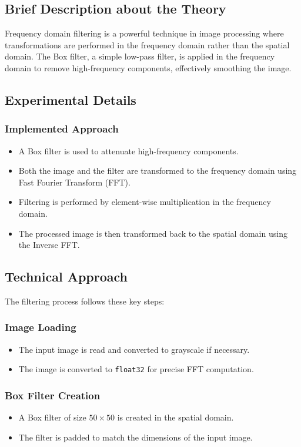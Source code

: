 \documentclass[12pt,a4paper]{article}
\begin{document}
\subsection{Brief Description about the Theory}
Frequency domain filtering is a powerful technique in image processing where transformations are performed in the frequency domain rather than the spatial domain. The Box filter, a simple low-pass filter, is applied in the frequency domain to remove high-frequency components, effectively smoothing the image.

\subsection{Experimental Details}
\subsubsection{Implemented Approach}
\begin{itemize}
  \item A Box filter is used to attenuate high-frequency components.
  \item Both the image and the filter are transformed to the frequency domain using Fast Fourier Transform (FFT).
  \item Filtering is performed by element-wise multiplication in the frequency domain.
  \item The processed image is then transformed back to the spatial domain using the Inverse FFT.
\end{itemize}

\subsection{Technical Approach}
The filtering process follows these key steps:

\subsubsection{Image Loading}
\begin{itemize}
  \item The input image is read and converted to grayscale if necessary.
  \item The image is converted to \texttt{float32} for precise FFT computation.
\end{itemize}

\subsubsection{Box Filter Creation}
\begin{itemize}
  \item A Box filter of size \(50 \times 50\) is created in the spatial domain.
  \item The filter is padded to match the dimensions of the input image.
\end{itemize}
\end{document}
